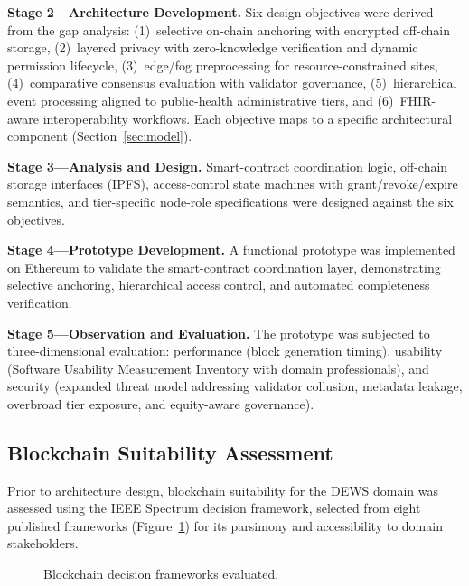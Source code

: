 \documentclass[AMA,LATO1COL]{WileyNJD-v2}
\begin{document}
\textbf{Stage 2---Architecture Development.} Six design objectives were derived from the gap analysis: (1)~selective on-chain anchoring with encrypted off-chain storage, (2)~layered privacy with zero-knowledge verification and dynamic permission lifecycle, (3)~edge/fog preprocessing for resource-constrained sites, (4)~comparative consensus evaluation with validator governance, (5)~hierarchical event processing aligned to public-health administrative tiers, and (6)~FHIR-aware interoperability workflows. Each objective maps to a specific architectural component (Section~\ref{sec:model}).

\textbf{Stage 3---Analysis and Design.} Smart-contract coordination logic, off-chain storage interfaces (IPFS), access-control state machines with grant/revoke/expire semantics, and tier-specific node-role specifications were designed against the six objectives.

\textbf{Stage 4---Prototype Development.} A functional prototype was implemented on Ethereum to validate the smart-contract coordination layer, demonstrating selective anchoring, hierarchical access control, and automated completeness verification.

\textbf{Stage 5---Observation and Evaluation.} The prototype was subjected to three-dimensional evaluation: performance (block generation timing), usability (Software Usability Measurement Inventory with domain professionals), and security (expanded threat model addressing validator collusion, metadata leakage, overbroad tier exposure, and equity-aware governance).

\subsection{Blockchain Suitability Assessment}\label{subsec:suitability}

Prior to architecture design, blockchain suitability for the DEWS domain was assessed using the IEEE Spectrum decision framework\cite{peck2017blockchain}, selected from eight published frameworks (Figure~\ref{fig:frameworks}) for its parsimony and accessibility to domain stakeholders.

\begin{figure}[!ht]
\centering
{}
\caption{Blockchain decision frameworks evaluated.}\label{fig:frameworks}
\end{figure}
\end{document}
